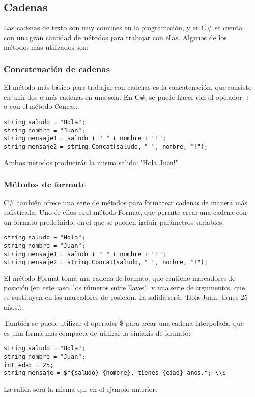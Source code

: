 \documentclass[executivepaper]{article}
\begin{document}
\subsection{Cadenas}

Las cadenas de texto son muy comunes en la programación, y en C\# se cuenta con una gran cantidad de métodos para trabajar con ellas. Algunos de los métodos más utilizados son:

\subsubsection*{Concatenación de cadenas}

El método más básico para trabajar con cadenas es la concatenación, que consiste en unir dos o más cadenas en una sola. En C\#, se puede hacer con el operador + o con el método Concat:
\begin{lstlisting}
string saludo = "Hola";
string nombre = "Juan";
string mensaje1 = saludo + " " + nombre + "!";
string mensaje2 = string.Concat(saludo, " ", nombre, "!");
\end{lstlisting}
Ambos métodos producirán la misma salida: "Hola Juan!".

\subsubsection*{Métodos de formato}

C\# también ofrece una serie de métodos para formatear cadenas de manera más sofisticada. Uno de ellos es el método Format, que permite crear una cadena con un formato predefinido, en el que se pueden incluir parámetros variables:
\begin{lstlisting}
string saludo = "Hola";
string nombre = "Juan";
string mensaje1 = saludo + " " + nombre + "!";
string mensaje2 = string.Concat(saludo, " ", nombre, "!");
\end{lstlisting}

El método Format toma una cadena de formato, que contiene marcadores de posición (en este caso, los números entre llaves), y una serie de argumentos, que se sustituyen en los marcadores de posición. La salida será: \enquote*{Hola Juan, tienes 25 años.}.

También se puede utilizar el operador \$ para crear una cadena interpolada, que es una forma más compacta de utilizar la sintaxis de formato:

\begin{lstlisting}
string saludo = "Hola";
string nombre = "Juan";
int edad = 25;
string mensaje = $"{saludo} {nombre}, tienes {edad} anos."; \\$
\end{lstlisting}
La salida será la misma que en el ejemplo anterior.
\end{document}
